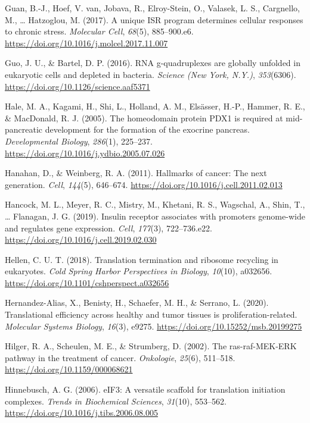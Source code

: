 \documentclass[12pt,openany]{book}
\begin{document}
\hypertarget{ref-Guan2017}{}
Guan, B.-J., Hoef, V. van, Jobava, R., Elroy-Stein, O., Valasek, L. S.,
Cargnello, M., \ldots{} Hatzoglou, M. (2017). A unique ISR program
determines cellular responses to chronic stress. \emph{Molecular Cell},
\emph{68}(5), 885--900.e6.
\url{https://doi.org/10.1016/j.molcel.2017.11.007}

\hypertarget{ref-Guo2016}{}
Guo, J. U., \& Bartel, D. P. (2016). RNA g-quadruplexes are globally
unfolded in eukaryotic cells and depleted in bacteria. \emph{Science
(New York, N.Y.)}, \emph{353}(6306).
\url{https://doi.org/10.1126/science.aaf5371}

\hypertarget{ref-Hale2005}{}
Hale, M. A., Kagami, H., Shi, L., Holland, A. M., Elsässer, H.-P.,
Hammer, R. E., \& MacDonald, R. J. (2005). The homeodomain protein PDX1
is required at mid-pancreatic development for the formation of the
exocrine pancreas. \emph{Developmental Biology}, \emph{286}(1),
225--237. \url{https://doi.org/10.1016/j.ydbio.2005.07.026}

\hypertarget{ref-Hanahan2011}{}
Hanahan, D., \& Weinberg, R. A. (2011). Hallmarks of cancer: The next
generation. \emph{Cell}, \emph{144}(5), 646--674.
\url{https://doi.org/10.1016/j.cell.2011.02.013}

\hypertarget{ref-Hancock2019}{}
Hancock, M. L., Meyer, R. C., Mistry, M., Khetani, R. S., Wagschal, A.,
Shin, T., \ldots{} Flanagan, J. G. (2019). Insulin receptor associates
with promoters genome-wide and regulates gene expression. \emph{Cell},
\emph{177}(3), 722--736.e22.
\url{https://doi.org/10.1016/j.cell.2019.02.030}

\hypertarget{ref-Hellen2018}{}
Hellen, C. U. T. (2018). Translation termination and ribosome recycling
in eukaryotes. \emph{Cold Spring Harbor Perspectives in Biology},
\emph{10}(10), a032656.
\url{https://doi.org/10.1101/cshperspect.a032656}

\hypertarget{ref-Hernandez-Alias2020}{}
Hernandez-Alias, X., Benisty, H., Schaefer, M. H., \& Serrano, L.
(2020). Translational efficiency across healthy and tumor tissues is
proliferation-related. \emph{Molecular Systems Biology}, \emph{16}(3),
e9275. \url{https://doi.org/10.15252/msb.20199275}

\hypertarget{ref-Hilger2002}{}
Hilger, R. A., Scheulen, M. E., \& Strumberg, D. (2002). The
ras-raf-MEK-ERK pathway in the treatment of cancer. \emph{Onkologie},
\emph{25}(6), 511--518. \url{https://doi.org/10.1159/000068621}

\hypertarget{ref-Hinnebusch2006}{}
Hinnebusch, A. G. (2006). eIF3: A versatile scaffold for translation
initiation complexes. \emph{Trends in Biochemical Sciences},
\emph{31}(10), 553--562.
\url{https://doi.org/10.1016/j.tibs.2006.08.005}
\end{document}
